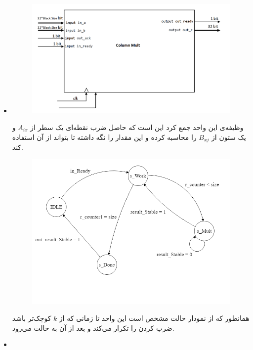 \documentclass[12pt,onecolumn,a4paper,fleqn]{article}
\begin{document}
\begin{itemize}
\pagebreak

\item {}

	\begin{figure}[h]
	\centering
	\includegraphics[trim={0 2cm 0 0}, clip, width=0.7 \linewidth]{source/columnMult.png}
	\caption{}
	
\end{figure}

وظیفه‌ی این واحد جمع کرد این است که حاصل ضرب نقطه‌ای یک سطر از $A_{ix}$ و یک ستون از $B_{xj}$ را محاسبه کرده و این مقدار را نگه داشته تا  بتواند از آن استفاده کند. 

	\begin{figure}[h]
	\centering
	\includegraphics[trim={0 2cm 0 0}, clip, width=0.7 \linewidth]{source/column_mult.png}
	\caption{}

\end{figure}

همانطور که از نمودار حالت مشخص است این واحد تا زمانی که  از $k$ کوچک‌تر باشد ضرب کردن را تکرار می‌کند و بعد از آن به حالت  می‌رود.
	
\pagebreak

\item {}


\end{itemize}
\end{document}
